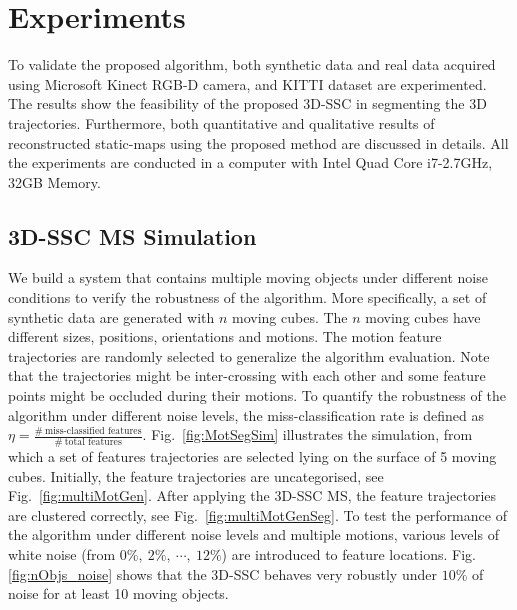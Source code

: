 \documentclass[10pt,twocolumn,letterpaper]{article}  %
\begin{document}
\section{Experiments}
\label{experiment}
To validate the proposed algorithm, both synthetic data and real data acquired using Microsoft Kinect RGB-D camera, and KITTI dataset \cite{c32} are experimented. The results show the feasibility of the proposed 3D-SSC in segmenting the 3D trajectories. Furthermore, both quantitative and qualitative results of reconstructed static-maps using the proposed method are discussed in details. All the experiments are conducted in a computer with Intel Quad Core i7-2.7GHz, 32GB Memory.

\subsection{3D-SSC MS Simulation}
We build a system that contains multiple moving objects under different noise conditions to verify the robustness of the algorithm. More specifically, a set of synthetic data are generated with $\textit{n}$ moving cubes. The $\textit{n}$ moving cubes have different sizes, positions, orientations and motions. The motion feature trajectories are randomly selected to generalize the algorithm evaluation. Note that the trajectories might be inter-crossing with each other and some feature points might be occluded during their motions. To quantify the robustness of the algorithm under different noise levels, the miss-classification rate is defined as
$\eta = \frac{\# \ \text{miss-classified features} }{ \# \ \text{total features} }$. Fig.~\ref{fig:MotSegSim} illustrates the simulation, from which a set of features trajectories are selected lying on the surface of 5 moving cubes. Initially, the feature trajectories are uncategorised, see Fig.~\ref{fig:multiMotGen}. After applying the 3D-SSC MS, the feature trajectories are clustered correctly, see Fig.~\ref{fig:multiMotGenSeg}. To test the performance of the algorithm under different noise levels and multiple motions, various levels of white noise (from ${0\%, \ 2\%, \ \cdots, \ 12\%}$) are introduced to feature locations. Fig.\ref{fig:nObjs_noise} shows that the 3D-SSC behaves very robustly under $10\%$ of noise for at least 10 moving objects.
\end{document}
